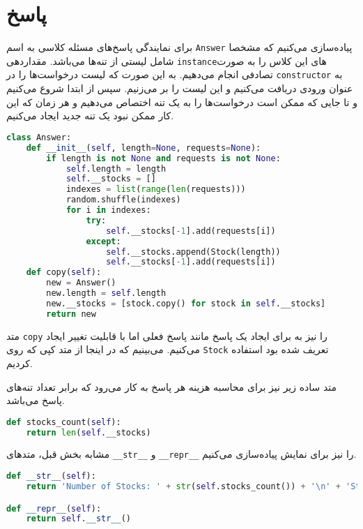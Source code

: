 \documentclass[a4paper, 12pt]{article}
\begin{document}
\section{پاسخ}
برای نمایندگی پاسخ‌های مسئله کلاسی به اسم
\texttt{Answer}
پیاده‌سازی می‌کنیم که مشخصا شامل لیستی از تنه‌ها می‌باشد. مقداردهی
\texttt{instance}های
این کلاس را به صورت تصادفی انجام می‌دهیم. به این صورت که لیست درخواست‌ها را در
\texttt{constructor}
به عنوان ورودی دریافت می‌کنیم و این لیست را بر می‌زنیم. سپس از ابتدا شروع می‌کنیم و تا جایی که ممکن است درخواست‌ها را به یک تنه اختصاص می‌دهیم و هر زمان که این کار ممکن نبود یک تنه جدید ایجاد می‌کنیم.

\LTR
\begin{lstlisting}[language=Python]
class Answer:
    def __init__(self, length=None, requests=None):
        if length is not None and requests is not None:
            self.length = length
            self.__stocks = []
            indexes = list(range(len(requests)))
            random.shuffle(indexes)
            for i in indexes:
                try:
                    self.__stocks[-1].add(requests[i])
                except:
                    self.__stocks.append(Stock(length))
                    self.__stocks[-1].add(requests[i])
    def copy(self):
        new = Answer()
        new.length = self.length
        new.__stocks = [stock.copy() for stock in self.__stocks]
        return new
\end{lstlisting}
\RTL

متد
\texttt{copy}
را نیز به برای ایجاد یک پاسخ مانند پاسخ فعلی اما با قابلیت تغییر ایجاد می‌کنیم. می‌بینیم که در اینجا از متد کپی که روی
\texttt{Stock}
تعریف شده بود استفاده کردیم.

متد ساده زیر نیز برای محاسبه هزینه هر پاسخ به کار می‌رود که برابر تعداد تنه‌های پاسخ می‌باشد.

\LTR
\begin{lstlisting}[language=Python]
def stocks_count(self):
    return len(self.__stocks)
\end{lstlisting}
\RTL

مشابه بخش قبل،  متدهای
\texttt{\_\_str\_\_}
و
\texttt{\_\_repr\_\_}
را نیز برای نمایش پیاده‌سازی می‌کنیم.

\LTR
\begin{lstlisting}[language=Python]
def __str__(self):
    return 'Number of Stocks: ' + str(self.stocks_count()) + '\n' + 'Stocks:\n' + ''.join(map(str, self.__stocks)) + '\n'

def __repr__(self):
    return self.__str__()
\end{lstlisting}
\RTL
\end{document}
